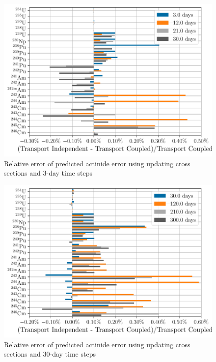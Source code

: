     \begin{figure}[htpb]
        \centering
        \includegraphics[width=\linewidth]{figs/actinides_updating_xs_predictor_fission_q_days.pdf}
        \caption{Relative error of predicted actinide error using
        updating cross sections and 3-day time steps}
        \label{fig:actinides-error-updating-xs-days}
    \end{figure}

    \begin{figure}[htpb]
        \centering
        \includegraphics[width=\linewidth]{figs/actinides_updating_xs_predictor_fission_q_months.pdf}
        \caption{Relative error of predicted actinide error using
        updating cross sections and 30-day time steps}
        \label{fig:actinides-error-updating-xs-months}
    \end{figure}



